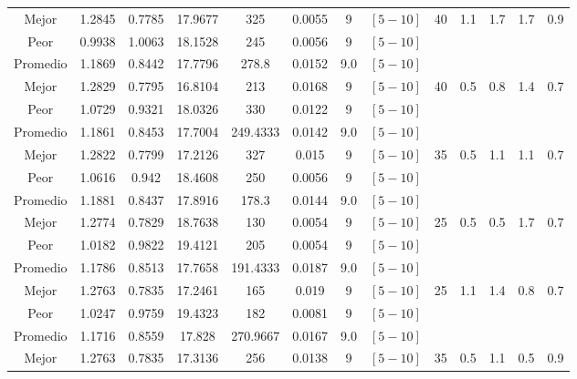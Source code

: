 \begin{table}[h!]
\begin{center}
\begin{tabular}{|c|c|c|c|c|c|c|c|c|c|c|c|c|}
            Mejor & 1.2845 & 0.7785  & 17.9677 & 325 & 0.0055 & 9 & $[5-10]$ & 40 & 1.1 & 1.7 & 1.7 & 0.9\\
            \cline{1-8}
            Peor & 0.9938 & 1.0063  & 18.1528 & 245 & 0.0056 & 9 & $[5-10]$ &  &  &  &  & \\
        \hline
        \hline
            Promedio  & 1.1869 & 0.8442 & 17.7796 & 278.8 & 0.0152 & 9.0 & $[5-10]$ &  &  &  &  & \\
            \cline{1-8}
            Mejor & 1.2829 & 0.7795  & 16.8104 & 213 & 0.0168 & 9 & $[5-10]$ & 40 & 0.5 & 0.8 & 1.4 & 0.7\\
            \cline{1-8}
            Peor & 1.0729 & 0.9321  & 18.0326 & 330 & 0.0122 & 9 & $[5-10]$ &  &  &  &  & \\
        \hline
        \hline
            Promedio  & 1.1861 & 0.8453 & 17.7004 & 249.4333 & 0.0142 & 9.0 & $[5-10]$ &  &  &  &  & \\
            \cline{1-8}
            Mejor & 1.2822 & 0.7799  & 17.2126 & 327 & 0.015 & 9 & $[5-10]$ & 35 & 0.5 & 1.1 & 1.1 & 0.7\\
            \cline{1-8}
            Peor & 1.0616 & 0.942  & 18.4608 & 250 & 0.0056 & 9 & $[5-10]$ &  &  &  &  & \\
        \hline
        \hline
            Promedio  & 1.1881 & 0.8437 & 17.8916 & 178.3 & 0.0144 & 9.0 & $[5-10]$ &  &  &  &  & \\
            \cline{1-8}
            Mejor & 1.2774 & 0.7829  & 18.7638 & 130 & 0.0054 & 9 & $[5-10]$ & 25 & 0.5 & 0.5 & 1.7 & 0.7\\
            \cline{1-8}
            Peor & 1.0182 & 0.9822  & 19.4121 & 205 & 0.0054 & 9 & $[5-10]$ &  &  &  &  & \\
        \hline
        \hline
            Promedio  & 1.1786 & 0.8513 & 17.7658 & 191.4333 & 0.0187 & 9.0 & $[5-10]$ &  &  &  &  & \\
            \cline{1-8}
            Mejor & 1.2763 & 0.7835  & 17.2461 & 165 & 0.019 & 9 & $[5-10]$ & 25 & 1.1 & 1.4 & 0.8 & 0.7\\
            \cline{1-8}
            Peor & 1.0247 & 0.9759  & 19.4323 & 182 & 0.0081 & 9 & $[5-10]$ &  &  &  &  & \\
        \hline
        \hline
            Promedio  & 1.1716 & 0.8559 & 17.828 & 270.9667 & 0.0167 & 9.0 & $[5-10]$ &  &  &  &  & \\
            \cline{1-8}
            Mejor & 1.2763 & 0.7835  & 17.3136 & 256 & 0.0138 & 9 & $[5-10]$ & 35 & 0.5 & 1.1 & 0.5 & 0.9\\

\end{tabular}
\end{center}
\end{table}
